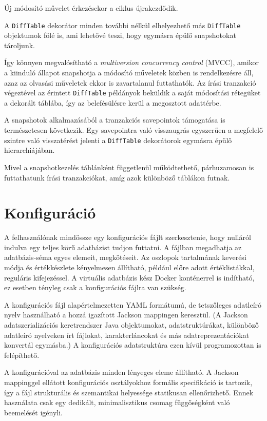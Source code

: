 \documentclass[
    parspace,
    noindent,
    nohyp,
]{elteiktdk}[2023/04/10]
\begin{document}
Új módosító művelet érkezésekor a ciklus újrakezdődik.

A \texttt{DiffTable} dekorátor minden további nélkül elhelyezhető
más \texttt{DiffTable} objektumok fölé is, ami lehetővé teszi, hogy egymásra épülő snapshotokat tároljunk.

Így könnyen megvalósítható a \textit{multiversion concurrency control} (MVCC),
amikor a kiinduló állapot snapshotja a módosító műveletek közben is rendelkezésre áll,
azaz az olvasási műveletek ekkor is zavartalanul futtathatók.
Az írási tranzakció végeztével az érintett \texttt{DiffTable} példányok
beküldik a saját módosítási rétegüket a dekorált táblába,
így az belefésülésre kerül a megosztott adattérbe.

A snapshotok alkalmazásából a tranzakciós savepointok támogatása is természetesen következik.
Egy savepointra való visszaugrás egyszerűen a megfelelő szintre való visszatérést jelenti
a \texttt{DiffTable} dekorátorok egymásra épülő hierarchiájában.

Mivel a snapshotkezelés táblánként függetlenül működtethető,
párhuzamosan is futtathatunk írási tranzakciókat,
amíg azok különböző táblákon futnak.


\section{Konfiguráció}

A felhasználónak mindössze egy konfigurációs fájlt szerkesztenie,
hogy nulláról indulva egy teljes körű adatbázist tudjon futtatni.
A fájlban megadhatja az adatbázis-séma egyes elemeit, megkötéseit.
Az oszlopok tartalmának keverési módja és értékkészlete kényelmesen állítható,
például előre adott értéklistákkal, reguláris kifejezéssel.
A virtuális adatbázis kész Docker konténerrel is indítható,
ez esetben tényleg csak a konfigurációs fájlra van szükség.

A konfigurációs fájl alapértelmezetten YAML formátumú,
de tetszőleges adatleíró nyelv használható
a hozzá igazított Jackson mappingen keresztül.
(A Jackson adatszerializációs keretrendszer Java objektumokat, adatstruktúrákat,
különböző adatleíró nyelveken írt fájlokat, karakterláncokat
és más adatreprezentációkat konvertál egymásba.)
A konfigurációs adatstruktúra ezen kívül programozottan is felépíthető.

A konfigurációval az adatbázis minden lényeges eleme állítható.
A Jackson mappinggel ellátott konfigurációs osztályokhoz formális specifikáció is tartozik,
így a fájl strukturális és szemantikai helyessége statikusan ellenőrizhető.
Ennek használata csak egy dedikált, minimalisztikus csomag függőségként való beemelését igényli.
\end{document}
